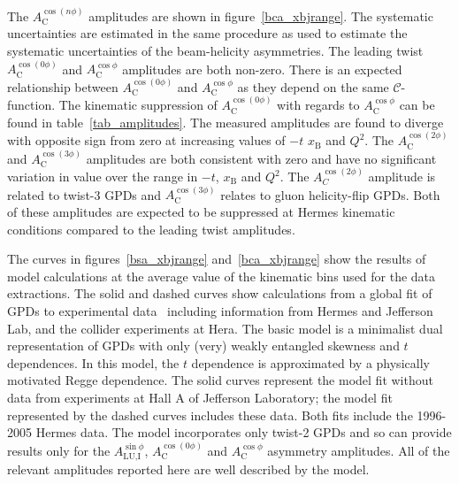 The $A_{\textrm{C}}^{\cos(n\phi)}$ amplitudes are shown in figure~\ref{bca_xbjrange}. The systematic uncertainties are estimated in the same procedure as used to estimate the systematic uncertainties of the beam-helicity asymmetries. The leading twist $A_{\textrm{C}}^{\cos(0\phi)}$ and $A_{\textrm{C}}^{\cos\phi}$ amplitudes are both non-zero. There is an expected relationship between $A_{\textrm{C}}^{\cos(0\phi)}$ and $A_{\textrm{C}}^{\cos\phi}$ as they depend on the same $\mathcal{C}$-function. The kinematic suppression of $A_{\textrm{C}}^{\cos(0\phi)}$ with regards to $A_{\textrm{C}}^{\cos\phi}$ can be found in table~\ref{tab_amplitudes}. The measured amplitudes are found to diverge with opposite sign from zero at increasing values of $-t$  $x_{\textrm{B}}$ and $Q^{2}$. The $A_{\textrm{C}}^{\cos(2\phi)}$ and $A_{\textrm{C}}^{\cos(3\phi)}$ amplitudes are both consistent with zero and have no significant variation in value over the range in $-t$, $x_{\textrm{B}}$ and $Q^{2}$. The $A_{C}^{\cos(2\phi)}$ amplitude is related to twist-3 GPDs and $A_{\textrm{C}}^{\cos(3\phi)}$ relates to gluon helicity-flip GPDs. Both of these amplitudes are expected to be suppressed at H{\sc ermes} kinematic conditions compared to the leading twist amplitudes. 

The curves in  figures~\ref{bsa_xbjrange} and~\ref{bca_xbjrange} show the results of model calculations at the average value of the kinematic bins used for the data extractions. The solid and dashed curves show calculations from a global fit of GPDs to experimental data~\cite{Kum09} including information from H{\sc ermes} and Jefferson Lab, and the collider experiments at H{\sc era}. The basic model is a minimalist dual representation of GPDs with only (very) weakly entangled skewness and $t$ dependences. In this model, the $t$ dependence is approximated by a physically motivated Regge dependence. The solid curves represent the model fit without data from experiments \cite{Cam06, Gir08} at Hall A of Jefferson Laboratory; the model fit represented by the dashed curves includes these data. Both fits include the 1996-2005 H{\sc ermes} data. The model incorporates only twist-2 GPDs and so can provide results only for the $A_{\textrm{LU,I}}^{\sin\phi}$, $A_{\textrm{C}}^{\cos(0\phi)}$ and $A_{\textrm{C}}^{\cos\phi}$ asymmetry amplitudes. All of the relevant amplitudes reported here are well described by the model.

